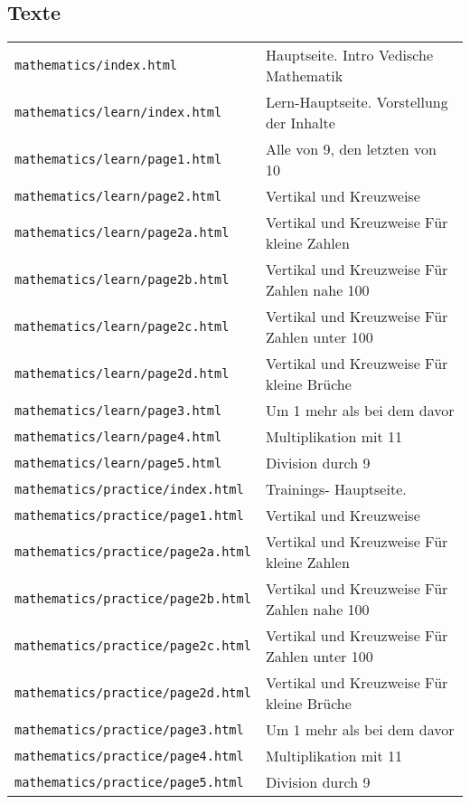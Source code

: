\subsection{Texte}
\begin{tabular}{ | p{} | p{} | } 
	\texttt{mathematics/index.html}	& Hauptseite. Intro Vedische Mathematik\\
	\texttt{mathematics/learn/index.html}	& Lern-Hauptseite. Vorstellung der Inhalte\\
	\texttt{mathematics/learn/page1.html}	& Alle von 9, den letzten von 10\\
	\texttt{mathematics/learn/page2.html}	& Vertikal und Kreuzweise\\
	\texttt{mathematics/learn/page2a.html}	& Vertikal und Kreuzweise Für kleine Zahlen\\
	\texttt{mathematics/learn/page2b.html}	& Vertikal und Kreuzweise Für Zahlen nahe 100\\
	\texttt{mathematics/learn/page2c.html}	& Vertikal und Kreuzweise Für Zahlen unter 100\\
	\texttt{mathematics/learn/page2d.html}	& Vertikal und Kreuzweise Für kleine Brüche\\
	\texttt{mathematics/learn/page3.html}	& Um 1 mehr als bei dem davor\\
	\texttt{mathematics/learn/page4.html}	& Multiplikation mit 11\\
	\texttt{mathematics/learn/page5.html}	& Division durch 9\\
	\texttt{mathematics/practice/index.html}	& Trainings- Hauptseite.\\
	\texttt{mathematics/practice/page1.html}	& Vertikal und Kreuzweise\\
	\texttt{mathematics/practice/page2a.html}	& Vertikal und Kreuzweise Für kleine Zahlen\\
	\texttt{mathematics/practice/page2b.html}	& Vertikal und Kreuzweise Für Zahlen nahe 100\\
	\texttt{mathematics/practice/page2c.html}	& Vertikal und Kreuzweise Für Zahlen unter 100\\
	\texttt{mathematics/practice/page2d.html}	& Vertikal und Kreuzweise Für kleine Brüche\\
	\texttt{mathematics/practice/page3.html}	& Um 1 mehr als bei dem davor\\
	\texttt{mathematics/practice/page4.html}	& Multiplikation mit 11\\
	\texttt{mathematics/practice/page5.html}	& Division durch 9\\
\end{tabular}




